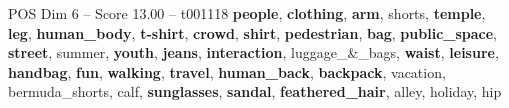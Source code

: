 \begin{textsample}{POS Dim 6 – Score 13.00 – t001118}  \label{ex:f6_pos_011}
\textbf{people}, \textbf{clothing}, \textbf{arm}, shorts, \textbf{temple}, \textbf{leg}, \textbf{human\_body}, \textbf{t-shirt}, \textbf{crowd}, \textbf{shirt}, \textbf{pedestrian}, \textbf{bag}, \textbf{public\_space}, \textbf{street}, summer, \textbf{youth}, \textbf{jeans}, \textbf{interaction}, luggage\_\&\_bags, \textbf{waist}, \textbf{leisure}, \textbf{handbag}, \textbf{fun}, \textbf{walking}, \textbf{travel}, \textbf{human\_back}, \textbf{backpack}, vacation, bermuda\_shorts, calf, \textbf{sunglasses}, \textbf{sandal}, \textbf{feathered\_hair}, alley, holiday, hip

\end{textsample}

